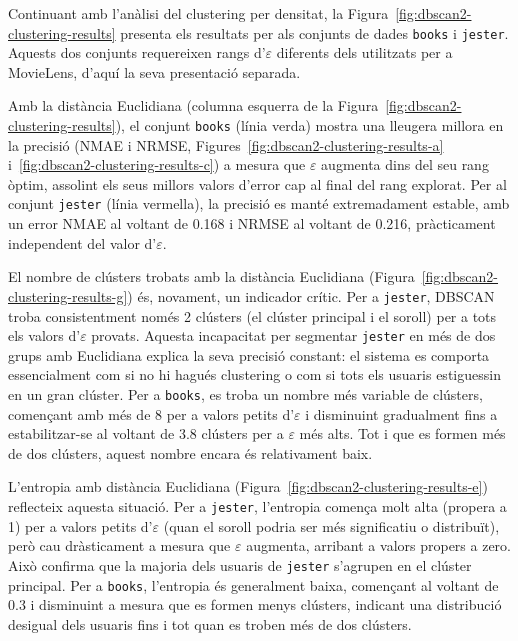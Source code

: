 \documentclass[a4paper,12pt]{report}
\begin{document}
Continuant amb l'anàlisi del clustering per densitat, la Figura~\ref{fig:dbscan2-clustering-results} presenta els resultats per als conjunts de dades \texttt{books} i \texttt{jester}. Aquests dos conjunts requereixen rangs d'\(\varepsilon\) diferents dels utilitzats per a MovieLens, d'aquí la seva presentació separada.

Amb la distància Euclidiana (columna esquerra de la Figura~\ref{fig:dbscan2-clustering-results}), el conjunt \texttt{books} (línia verda) mostra una lleugera millora en la precisió (NMAE i NRMSE, Figures~\ref{fig:dbscan2-clustering-results-a} i~\ref{fig:dbscan2-clustering-results-c}) a mesura que \(\varepsilon\) augmenta dins del seu rang òptim, assolint els seus millors valors d'error cap al final del rang explorat. Per al conjunt \texttt{jester} (línia vermella), la precisió es manté extremadament estable, amb un error NMAE al voltant de 0.168 i NRMSE al voltant de 0.216, pràcticament independent del valor d'\(\varepsilon\).

El nombre de clústers trobats amb la distància Euclidiana (Figura~\ref{fig:dbscan2-clustering-results-g}) és, novament, un indicador crític. Per a \texttt{jester}, DBSCAN troba consistentment només 2 clústers (el clúster principal i el soroll) per a tots els valors d'\(\varepsilon\) provats. Aquesta incapacitat per segmentar \texttt{jester} en més de dos grups amb Euclidiana explica la seva precisió constant: el sistema es comporta essencialment com si no hi hagués clustering o com si tots els usuaris estiguessin en un gran clúster. Per a \texttt{books}, es troba un nombre més variable de clústers, començant amb més de 8 per a valors petits d'\(\varepsilon\) i disminuint gradualment fins a estabilitzar-se al voltant de 3.8 clústers per a \(\varepsilon\) més alts. Tot i que es formen més de dos clústers, aquest nombre encara és relativament baix.

L'entropia amb distància Euclidiana (Figura~\ref{fig:dbscan2-clustering-results-e}) reflecteix aquesta situació. Per a \texttt{jester}, l'entropia comença molt alta (propera a 1) per a valors petits d'\(\varepsilon\) (quan el soroll podria ser més significatiu o distribuït), però cau dràsticament a mesura que \(\varepsilon\) augmenta, arribant a valors propers a zero. Això confirma que la majoria dels usuaris de \texttt{jester} s'agrupen en el clúster principal. Per a \texttt{books}, l'entropia és generalment baixa, començant al voltant de 0.3 i disminuint a mesura que es formen menys clústers, indicant una distribució desigual dels usuaris fins i tot quan es troben més de dos clústers.
\end{document}
